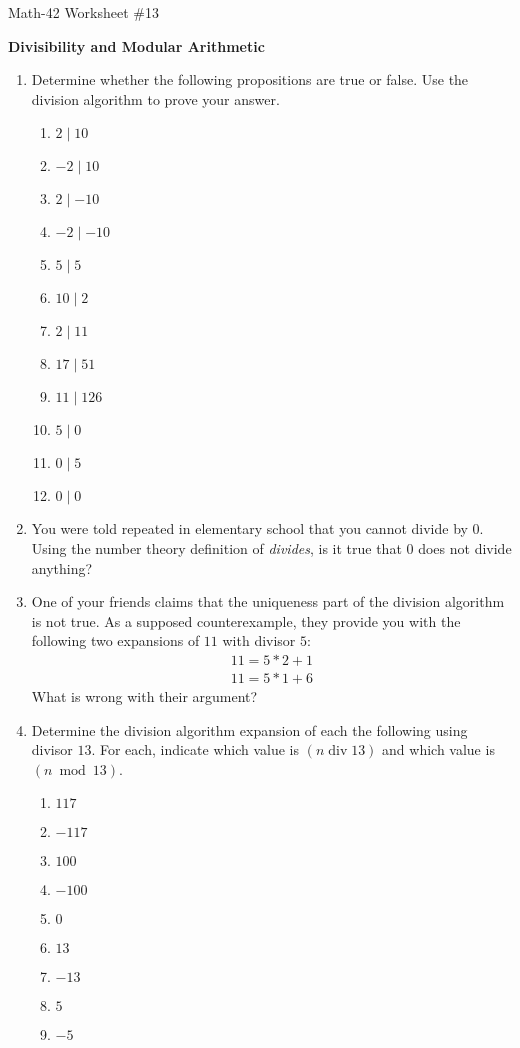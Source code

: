 \documentclass[letterpaper,12pt,fleqn]{article}
\DeclareMathOperator{\bdiv}{div}
\begin{document}
\begin{center}
  \large Math-42 Worksheet \#13

  \textbf{Divisibility and Modular Arithmetic}
\end{center}

\vspace{0.5in}

\begin{enumerate}[left=0in,itemsep=0.5in]
\item Determine whether the following propositions are true or false.  Use the division algorithm to prove your
  answer.
  \begin{enumerate}
  \item \(2\mid10\)
  \item \(-2\mid10\)
  \item \(2\mid-10\)
  \item \(-2\mid-10\)
  \item \(5\mid5\)
  \item \(10\mid2\)
  \item \(2\mid11\)
  \item \(17\mid51\)
  \item \(11\mid126\)
  \item \(5\mid0\)
  \item \(0\mid5\)
  \item \(0\mid0\)
  \end{enumerate}

\item You were told repeated in elementary school that you cannot divide by \(0\).  Using the number theory
  definition of \emph{divides}, is it true that \(0\) does not divide anything?

\item One of your friends claims that the uniqueness part of the division algorithm is not true.  As a supposed
  counterexample, they provide you with the following two expansions of \(11\) with divisor \(5\):
  \begin{gather*}
    11=5*2+1 \\
    11=5*1+6
  \end{gather*}
  What is wrong with their argument?

\item Determine the division algorithm expansion of each the following using divisor \(13\).  For each, indicate
  which value is \((n\bdiv 13)\) and which value is \((n\bmod 13)\).
  \begin{enumerate}
  \item \(117\)
  \item \(-117\)
  \item \(100\)
  \item \(-100\)
  \item \(0\)
  \item \(13\)
  \item \(-13\)
  \item \(5\)
  \item \(-5\)
  \end{enumerate}


\end{enumerate}
\end{document}

